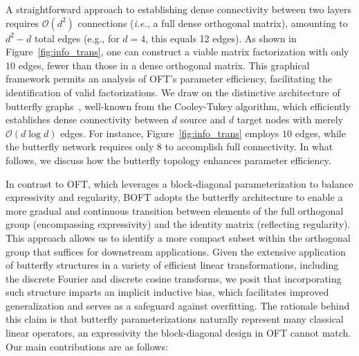 A straightforward approach to establishing dense connectivity between two layers requires $\mathcal{O}(d^2)$ connections (\emph{i.e.}, a full dense orthogonal matrix), amounting to $d^2-d$ total edges (e.g., for $d=4$, this equals 12 edges). As shown in Figure~\ref{fig:info_trans}, one can construct a viable matrix factorization with only $10$ edges, fewer than those in a dense orthogonal matrix. This graphical framework permits an analysis of OFT’s parameter efficiency, facilitating the identification of valid factorizations. We draw on the distinctive architecture of butterfly graphs~\cite{cooley1965algorithm}, well-known from the Cooley-Tukey algorithm, which efficiently establishes dense connectivity between $d$ source and $d$ target nodes with merely $\mathcal{O}(d\log d)$ edges. For instance, Figure~\ref{fig:info_trans} employs $10$ edges, while the butterfly network requires only $8$ to accomplish full connectivity. In what follows, we discuss how the butterfly topology enhances parameter efficiency.

In contrast to OFT, which leverages a block-diagonal parameterization to balance expressivity and regularity, BOFT adopts the butterfly architecture to enable a more gradual and continuous transition between elements of the full orthogonal group (encompassing expressivity) and the identity matrix (reflecting regularity). This approach allows us to identify a more compact subset within the orthogonal group that suffices for downstream applications. Given the extensive application of butterfly structures in a variety of efficient linear transformations, including the discrete Fourier and discrete cosine transforms, we posit that incorporating such structure imparts an implicit inductive bias, which facilitates improved generalization and serves as a safeguard against overfitting. The rationale behind this claim is that butterfly parameterizations naturally represent many classical linear operators, an expressivity the block-diagonal design in OFT cannot match. Our main contributions are as follows:

